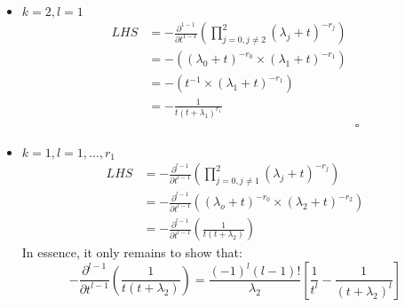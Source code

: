 \begin{itemize}
    \item \(k = 2, l = 1\)
    \begin{equation*}
        \begin{split}
            LHS &= - \frac{\partial^{1-1}}{\partial t^{1-1}} 
            \left( \prod_{j=0, j \neq 2}^{2} (\lambda_j + t)^{-r_j} \right) \\
            &=-\left( (\lambda_0 + t)^{-r_0} \times (\lambda_1 + t)^{-r_1} \right) \\
            &=-\left( t^{-1} \times (\lambda_1 + t)^{-r_1} \right) \\ 
            &= - \frac{1}{t(t + \lambda_1)^{r_1}} \\
            & \hspace{7cm} \square
        \end{split}
    \end{equation*}
    \item \(k = 1, l = 1, \dots, r_1\)
    \begin{equation*}
        \begin{split}
            LHS &= -\frac{\partial^{l-1}}{\partial t^{l-1}} 
            \left( \prod_{j=0, j \neq 1}^{2} (\lambda_j + t)^{-r_j} \right) \\
            &= -\frac{\partial^{l-1}}{\partial t^{l-1}}
            \left( (\lambda_o + t)^{-r_0} \times (\lambda_2 + t)^{-r_2} \right) \\
            &= -\frac{\partial^{l-1}}{\partial t^{l-1}}
            \left( \frac{1}{t(t + \lambda_2)}\right)
        \end{split}
    \end{equation*}
    In essence, it only remains to show that:
    \[-\frac{\partial^{l-1}}{\partial t^{l-1}} 
    \left( \frac{1}{t(t + \lambda_2)}\right) = \frac{(-1)^{l} (l-1)!}{\lambda_2}
    \left[\frac{1}{t^l} - \frac{1}{(t + \lambda_2)^l}\right]\]
    

\end{itemize}
